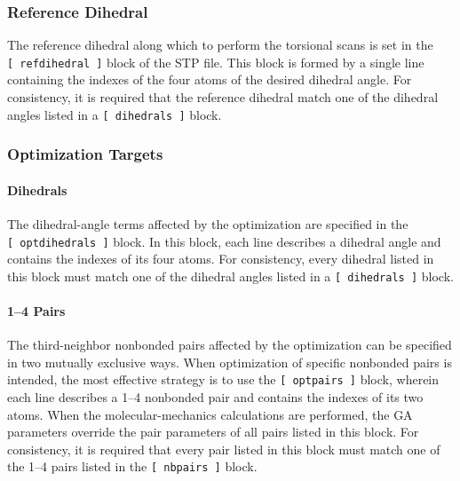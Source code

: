 \documentclass[10pt,a4paper,openany]{memoir}
\numberwithin{equation}{section}
\begin{document}
\subsubsection{Reference Dihedral}
\label{sec:stp-ref_dihedral}

The reference dihedral along which to perform the torsional scans is
set in the \texttt{[~refdihedral~]} block of the STP file. This block
is formed by a single line containing the indexes of the four atoms of
the desired dihedral angle. For consistency, it is required that the
reference dihedral match one of the dihedral angles listed in a
\texttt{[~dihedrals~]} block.

\subsubsection{Optimization Targets}
\label{sec:stp-optterms}

\paragraph{Dihedrals}

The dihedral-angle terms affected by the optimization are specified in the \texttt{[~optdihedrals~]} block.
In this block, each line describes a dihedral angle and contains the indexes of its four atoms.
For consistency, every dihedral listed in this block must match one of the dihedral angles listed in a \texttt{[~dihedrals~]} block. 


\paragraph{1--4 Pairs}

The third-neighbor nonbonded pairs affected by the optimization can be specified in two mutually exclusive ways.
When optimization of specific nonbonded pairs is intended, the most effective strategy is to use the \texttt{[~optpairs~]} block, wherein each line describes a 1--4 nonbonded pair and contains the indexes of its two atoms.
When the molecular-mechanics calculations are performed, the GA parameters override the pair parameters of all pairs listed in this block.
For consistency, it is required that every pair listed in this block must match one of the 1--4 pairs listed in the \texttt{[~nbpairs~]} block.
\end{document}
